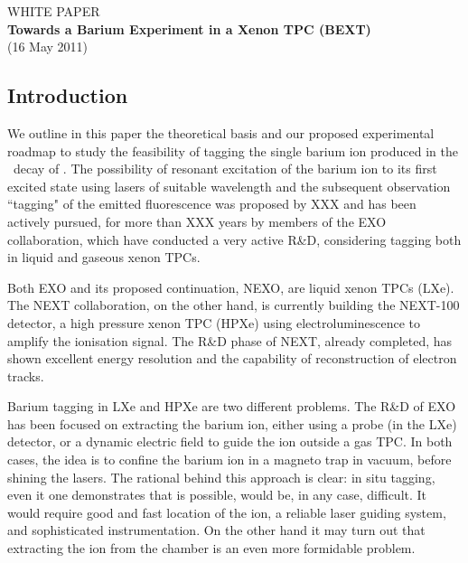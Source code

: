 \begin{titlepage}

\begin{center}
{\large \sf WHITE PAPER} \\ \vspace{0.65cm}
{\Huge \bf Towards a Barium Experiment in a Xenon TPC (BEXT)} \\ \vspace{0.75cm}
{(16 May 2011)} \\ \vspace{0.35cm}
\end{center}

\begin{center}
\begin{minipage}{15cm}
\section{Introduction}
We outline in this paper the theoretical basis and our proposed experimental roadmap to study the feasibility of tagging the single barium ion produced in the  \bb\ decay of \XE. The possibility of resonant excitation of the barium ion to its first excited state using lasers of suitable wavelength and the subsequent observation ``tagging" of the emitted fluorescence was proposed by XXX and has been actively pursued, for more than XXX years by members of the EXO collaboration, which have conducted a very active R\&D, considering tagging both in liquid and gaseous xenon TPCs.  

Both EXO and its proposed continuation, NEXO, are liquid xenon TPCs (LXe). The NEXT collaboration, on the other hand, is currently building the NEXT-100 detector, a high pressure xenon TPC (HPXe) using electroluminescence to amplify the ionisation signal. The R\&D phase of NEXT, already completed, has shown excellent energy resolution and the capability of reconstruction of electron tracks. 

Barium tagging in LXe and HPXe are two different problems. The R\&D of EXO has been focused on extracting the barium ion, either using a probe (in the LXe) detector, or a dynamic electric field to guide the ion outside a gas TPC. In both cases, the idea is to confine the barium ion in a magneto trap in vacuum, before shining the lasers. The rational behind this approach is clear: in situ tagging, even it one demonstrates that is possible, would be, in any case, difficult. It would require good and fast location of the ion, a reliable laser guiding system, and sophisticated instrumentation. On the other hand it may turn out that extracting the ion from the chamber is an even more formidable problem. 


\end{minipage}
\end{center}
\end{titlepage}
